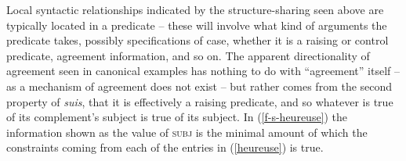 \documentclass[output=paper,hidelinks]{langscibook}
\begin{document}
\eabox{\label{heureuse}\ea
 \avm[style=fstr]{%
[pred & `pro'\\
  pers & 1\\
  num & sg ]
  }%
  \hbox to 14em{\hfill = je}
\vspace{0.5em}
\ex
\avm[style=fstr]{%
[ subj&\rnode{a}{[pers & 1\\
                   num & sg]}\smallskip\\
         {tense} & pres\\
         pred & `{be}\arglist{(\UP \SUBJ)(\UP \XCOMP)}' \\ 
  xcomp & [ subj & !\rnode{b}{[\ \ ]}! ]  ]
}%
\hbox to 6em{\hfill = suis}
\vspace{0.5em}
\CURVE[2.7]{-2pt}{0}{a}{-2pt}{0}{b}
\ex
\avm[style=fstr]{%
[ subj&[ gend & fem ]\\
         pred & `happy\arglist{(\UP \SUBJ)}']
}
\hbox to 11em{\hfill = heureuse}
  \z }


Local syntactic relationships indicated by the structure-sharing seen
above are typically located in a predicate -- these will involve what
kind of arguments the predicate takes, possibly specifications of
case, whether it is a raising or control predicate, agreement
information, and so on. The apparent directionality of agreement seen
in canonical examples has nothing to do with ``agreement'' itself --
as a mechanism of agreement does not exist -- but rather comes from
the second property of \textit{suis}, that it is effectively a raising
predicate, and so whatever is true of its complement's subject is true
of its subject. In (\ref{f-s-heureuse}) the information shown as the
value of \textsc{subj} is the minimal amount of which the constraints
coming from each of the entries in (\ref{heureuse}) is true.
\end{document}
